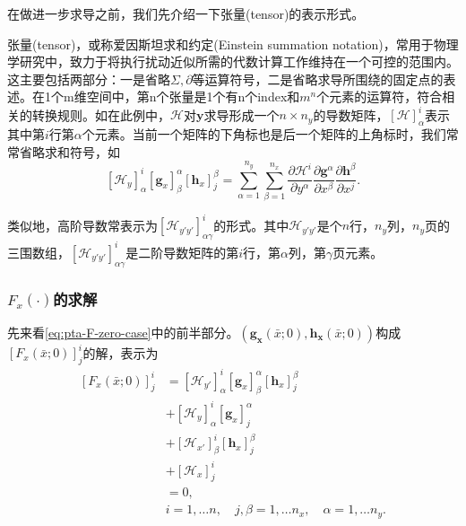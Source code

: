 在做进一步求导之前，我们先介绍一下张量(tensor)的表示形式。

\begin{remark}[张量形式]
  张量(tensor)，或称爱因斯坦求和约定(Einstein summation notation)，常用于物理学研究中，致力于将执行扰动近似所需的代数计算工作维持在一个可控的范围内。这主要包括两部分：一是省略$\Sigma, \partial$等运算符号，二是省略求导所围绕的固定点的表述。在1个m维空间中，第n个张量是1个有n个index和$m^{n}$个元素的运算符，符合相关的转换规则。如在此例中，$\mathcal{H}$对$\bm{y}$求导形成一个$n \times n_{y}$的导数矩阵，$\left[\mathcal{H}\right]_{\alpha}^{i}$表示其中第$i$行第$\alpha$个元素。当前一个矩阵的下角标也是后一个矩阵的上角标时，我们常常省略求和符号，如
  \begin{equation*}
    \left[ \mathcal{H}_{y} \right]_{\alpha}^{i}
    \left[ \bm{g}_{x} \right]^{\alpha}_{\beta}
     \left[ \bm{h}_{x} \right]^{\beta}_{j} = \sum_{\alpha=1}^{n_y} \sum_{\beta = 1}^{n_x}
     \frac{\partial \mathcal{H}^{i}}{\partial y^{\alpha}}
     \frac{\partial \bm{g}^{\alpha}}{\partial x^{\beta}}
     \frac{\partial \bm{h}^{\beta}}{\partial x^{j}}.
  \end{equation*}

  类似地，高阶导数常表示为$\left[ \mathcal{H}_{y'y'} \right]^{i}_{\alpha \gamma}$的形式。其中$\mathcal{H}_{y'y'}$是个$n$行，$n_y$列，$n_y$页的三围数组，$\left[ \mathcal{H}_{y'y'} \right]^{i}_{\alpha \gamma}$是二阶导数矩阵的第$i$行，第$\alpha$列，第$\gamma$页元素。
\end{remark}

\subsubsection{$F_x(\cdot)$的求解}
先来看\eqref{eq:pta-F-zero-case}中的前半部分。$\left(\bm{g_x}(\bar{x};0), \bm{h_x}(\bar{x};0) \right)$构成$\left[F_x(\bar{x};0)\right]^{i}_{j}$的解，表示为
\begin{equation}
  \label{eq:pta-1stp-Fx-0}
  \begin{split}
    \left[F_x(\bar{x};0)\right]^{i}_{j} &=
    \left[ \mathcal{H}_{y'} \right]^{i}_{\alpha}
    \left[ \bm{g}_x \right]^{\alpha}_{\beta}
    \left[ \bm{h}_x \right]^{\beta}_{j} \\
    &+
    \left[ \mathcal{H}_{y} \right]^{i}_{\alpha}
    \left[ \bm{g}_x \right]^{\alpha}_{j}\\
    &+
    \left[ \mathcal{H}_{x'} \right]^{i}_{\beta}
    \left[ \bm{h}_{x} \right]^{\beta}_{j} \\
    &+
    \left[ \mathcal{H}_{x} \right]^{i}_{j}\\
    &=0, \\
    &i=1,\ldots n, \quad j, \beta = 1, \ldots n_x, \quad \alpha = 1, \ldots n_y.
  \end{split}
\end{equation}

